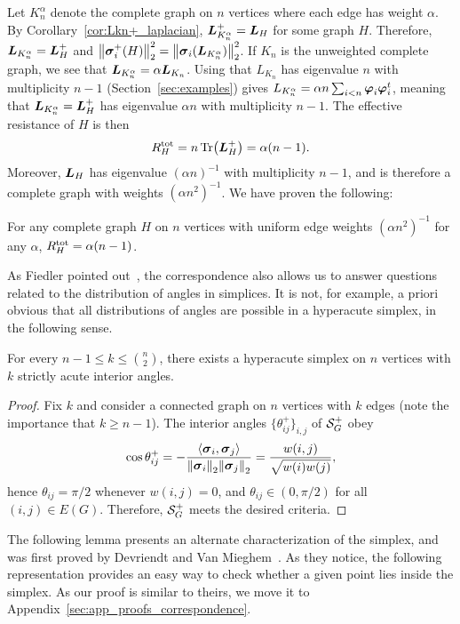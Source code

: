 Let $K_n^\alpha$ denote the complete graph on $n$ vertices where each edge has weight $\alpha$. By Corollary~\ref{cor:Lkn+_laplacian}, $\vb*{L}_{K_n^\alpha}^+=\vb*{L}_H$ for some graph $H$. Therefore, $\vb*{L}_{K_n^\alpha}=\vb*{L}_H^+$ and  $\norm{\vb*{\sigma}_i^+(H)}_2^2 = \norm{\vb*{\sigma}_i(\vb*{L}_{K_n^\alpha})}_2^2$.  If $K_n$ is the unweighted complete graph, we see that $\vb*{L}_{K_n^\alpha}=\alpha\vb*{L}_{K_n}$. Using  that $L_{K_n}$ has eigenvalue $n$ with multiplicity $n-1$  (Section~\ref{sec:examples}) gives $L_{K_n^\alpha}=\alpha n\sum_{i<n}\vb*{\varphi}_i\vb*{\varphi}_i^t$, meaning that $\vb*{L}_{K_n^\alpha}=\vb*{L}_H^+$ has eigenvalue $\alpha n$ with multiplicity $n-1$. The effective resistance of $H$ is then 
\begin{equation*}
R^{\textnormal{tot}}_H = n\Tr(\vb*{L}_H^+) = \alpha(n-1). 
\end{equation*}
Moreover, $\vb*{L}_H$ has eigenvalue $(\alpha n)^{-1}$ with multiplicity $n-1$, and  is therefore a complete graph with weights $(\alpha n^2)^{-1}$. We have proven the  following:  

\begin{lemma}
	For any complete graph $H$ on $n$ vertices with uniform edge weights  $(\alpha n^2)^{-1}$ for any $\alpha$,  $R^{\textnormal{tot}}_H = \alpha (n-1)$. 
\end{lemma}



As Fiedler pointed out~\cite{fiedler1993geometric}, the correspondence also allows us to answer questions related to the distribution of angles in simplices. It is not, for example, a priori obvious that all distributions of angles  are possible in a hyperacute simplex, in the following sense. 

\begin{lemma}
	For every $n-1\leq k \leq \binom{n}{2}$, there exists a hyperacute simplex on $n$ vertices with $k$ strictly acute interior angles. 
\end{lemma}
\begin{proof}
	Fix $k$ and consider a connected graph on $n$ vertices with $k$ edges (note the importance that $k\geq n-1$). The interior angles $\{\theta_{ij}^+\}_{i,j}$ of $\mathcal{S}_G^+$ obey \[\cos\theta^+_{ij} = -\frac{\langle \vb*{\sigma}_i,\vb*{\sigma}_j\rangle}{\norm{\vb*{\sigma}_i}_2\norm{\vb*{\sigma}_j}_2} = \frac{w(i,j)}{ \sqrt{w(i)w(j)}},\] hence $\theta_{ij}=\pi/2$ whenever $w(i,j)=0$, and $\theta_{ij}\in(0,\pi/2)$ for all $(i,j)\in E(G)$. Therefore, $\mathcal{S}_G^+$ meets the desired criteria. 
\end{proof}



The following lemma presents an alternate characterization of the simplex, and was first proved by Devriendt  and Van Mieghem~\cite{devriendt2018simplex}. As they notice, the following representation provides an easy way to check whether a given point lies inside the simplex. As our proof is similar  to theirs, we move  it to  Appendix~\ref{sec:app_proofs_correspondence}. 

